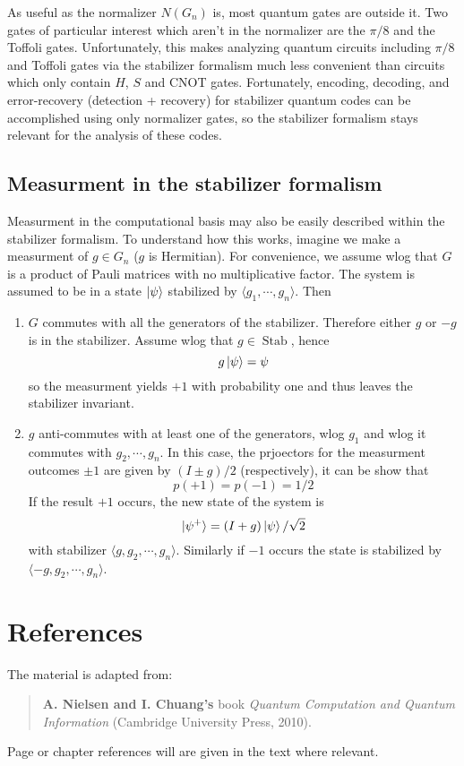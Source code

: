 \documentclass[11pt,a4paper]{article}
\theoremstyle{definition}
\theoremstyle{plain}
\theoremstyle{remark}
\begin{document}
As useful as the normalizer $N(G_n)$ is, most quantum gates are outside it. Two gates of particular 
interest which aren't in the normalizer are the $\pi / 8$ and the Toffoli gates. 
Unfortunately, this makes analyzing quantum circuits including $\pi / 8$ and Toffoli gates via the stabilizer 
formalism much less convenient than circuits which only contain $H$, $S$ and CNOT gates. 
Fortunately, encoding, decoding, and error-recovery (detection + recovery) for stabilizer quantum codes can be 
accomplished using only normalizer gates, so the stabilizer formalism stays relevant for the analysis of these codes. 

\subsection{Measurment in the stabilizer formalism} 
Measurment in the computational basis may also be easily described within the stabilizer formalism. 
To understand how this works, imagine we make a measurment of $g \in G_n$ ($g$ is Hermitian).
For convenience, we assume wlog that $G$ is a product of Pauli matrices with no multiplicative factor. 
The system is assumed to be in a state $\ket{\psi}$ stabilized by $\langle g_1, \cdots, g_n\rangle$. Then 
\begin{enumerate}
  \item $G$ commutes with all the generators of the stabilizer. Therefore either $g$ or $-g$ is in the stabilizer. Assume wlog that $g \in \operatorname{Stab}$, hence 
  $$ g \ket{\psi} = \psi$$
  so the measurment yields $+1$ with probability one and thus leaves the stabilizer invariant. 

  \item $g$ anti-commutes with at least one of the generators, wlog $g_1$ and wlog it commutes with $g_2, \cdots, g_n$. In this case, 
  the prjoectors for the measurment outcomes $\pm 1$ are given by $(I \pm g) / 2$ (respectively), it can be show that 
  $$p(+1) = p(-1) = 1/2$$
  If the result $+1$ occurs, the new state of the system is 
  $$\ket{\psi^+} = (I + g) \ket{\psi} / \sqrt{2}$$
  with stabilizer $\langle g, g_2, \cdots, g_n\rangle$. Similarly if $-1$ occurs the state is stabilized by 
  $\langle - g, g_2, \cdots, g_n \rangle$. 
\end{enumerate}

\section{References}
The material is adapted from: 
\begin{quote}
\textbf{A. Nielsen and I. Chuang's} book \emph{Quantum Computation and Quantum Information} (Cambridge University Press, 2010).
\end{quote}
Page or chapter references will are given in the text where relevant. 
\end{document}
